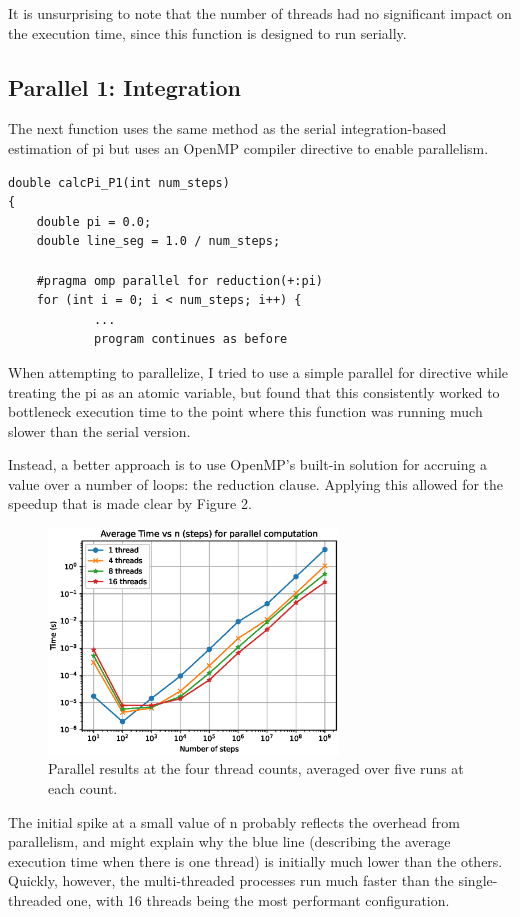 \documentclass[a4paper]{article}
\begin{document}
It is unsurprising to note that the number of threads had no significant impact on the execution time, since this function is designed to run serially.  

\subsection{Parallel 1: Integration}
The next function uses the same method as the serial integration-based estimation of pi but uses an OpenMP compiler directive to enable parallelism. 

\begin{verbatim}
double calcPi_P1(int num_steps)
{
    double pi = 0.0;
    double line_seg = 1.0 / num_steps;
    
    #pragma omp parallel for reduction(+:pi)
    for (int i = 0; i < num_steps; i++) {
            ... 
            program continues as before 
\end{verbatim}

When attempting to parallelize, I tried to use a simple parallel for directive while treating the pi as an atomic variable, but found that this consistently worked to bottleneck execution time to the point where this function was running much slower than the serial version. 

Instead, a better approach is to use OpenMP's built-in solution for accruing a value over a number of loops: the reduction clause. Applying this allowed for the speedup that is made clear by Figure 2. 

\begin{figure}[ht]
\begin{center}
\includegraphics[height=6cm]{paral1.eps}
\caption{Parallel results at the four thread counts, averaged over five runs at each count.}
\label{fig2}
\end{center}
\end{figure}

The initial spike at a small value of n probably reflects the overhead from parallelism, and might explain why the blue line (describing the average execution time when there is one thread) is initially much lower than the others. Quickly, however, the multi-threaded processes run much faster than the single-threaded one, with 16 threads being the most performant configuration. 
\end{document}
